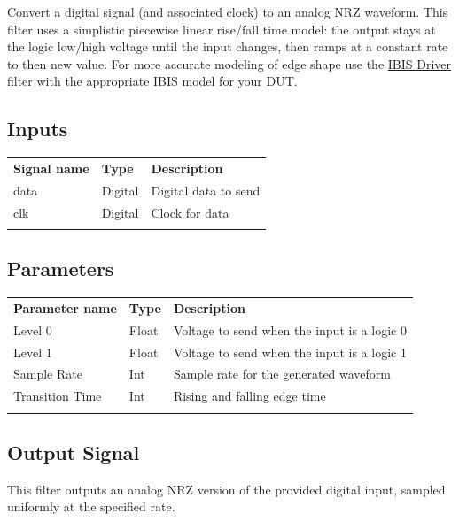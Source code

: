 Convert a digital signal (and associated clock) to an analog NRZ waveform. This filter uses a simplistic piecewise
linear rise/fall time model: the output stays at the logic low/high voltage until the input changes, then ramps at a
constant rate to then new value. For more accurate modeling of edge shape use the \hyperref[filter:ibisdriver]{IBIS
Driver} filter with the appropriate IBIS model for your DUT.

\subsection{Inputs}

\begin{tabularx}{16cm}{llX}
\thickhline
\textbf{Signal name} & \textbf{Type} & \textbf{Description} \\
\thickhline
data & Digital & Digital data to send\\
\thinhline
clk & Digital & Clock for data\\
\thickhline
\end{tabularx}

\subsection{Parameters}

\begin{tabularx}{16cm}{llX}
\thickhline
\textbf{Parameter name} & \textbf{Type} & \textbf{Description} \\
\thickhline
Level 0 & Float & Voltage to send when the input is a logic 0\\
\thinhline
Level 1 & Float & Voltage to send when the input is a logic 1\\
\thinhline
Sample Rate & Int & Sample rate for the generated waveform\\
\thinhline
Transition Time & Int & Rising and falling edge time\\
\thickhline
\end{tabularx}

\subsection{Output Signal}

This filter outputs an analog NRZ version of the provided digital input, sampled uniformly at the specified rate.

\pagebreak
